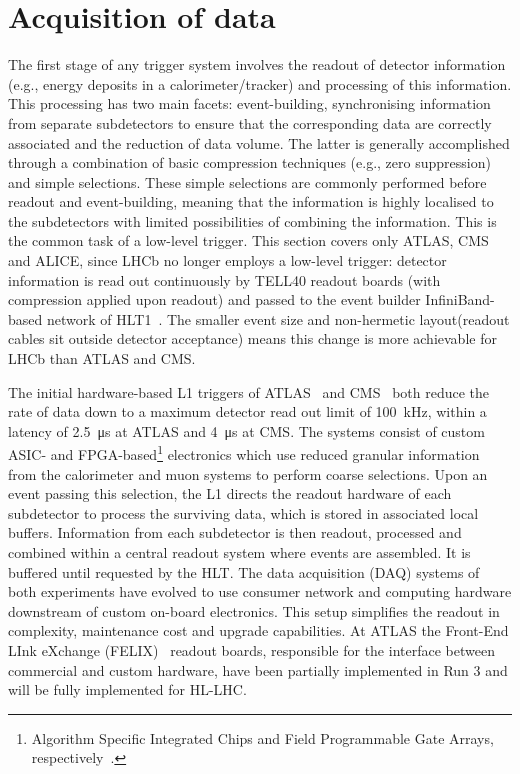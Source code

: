 \section{Acquisition of data}
The first stage of any trigger system involves the readout of detector information (e.g.,  energy deposits in a calorimeter/tracker) and processing of this information. This processing has two main facets: event-building, synchronising information from separate subdetectors to ensure that the corresponding data are correctly associated and the reduction of data volume. The latter is generally accomplished through a combination of basic compression techniques (e.g., zero suppression) and simple selections. These simple selections are commonly performed before readout and event-building, meaning that the information is highly localised to the subdetectors with limited possibilities of combining the information. This is the common task of a low-level trigger. This section covers only ATLAS, CMS and ALICE, since LHCb no longer employs a low-level trigger: detector information is read out continuously by TELL40 readout boards (with compression applied upon readout) and passed to the event builder InfiniBand-based network of HLT1~\cite{LHCb:2023hlw}. The smaller event size and non-hermetic layout(readout cables sit outside detector acceptance) means this change is more achievable for LHCb than ATLAS and CMS.


The initial hardware-based L1 triggers of ATLAS~\cite{ATLASRun3Detector} and CMS~\cite{cms2023development} both reduce the rate of data down to a maximum detector read out limit of \SI{100}{\kilo\hertz}, within a latency of \SI{2.5}{\micro\second} at ATLAS and \SI{4}{\micro\second} at CMS. The systems consist of custom ASIC- and FPGA-based\footnote{Algorithm Specific Integrated Chips and Field Programmable Gate Arrays, respectively~\cite{asics-fpgas}.} electronics which use reduced granular information from the calorimeter and muon systems to perform coarse selections. Upon an event passing this selection, the L1 directs the readout hardware of each subdetector to process the surviving data, which is stored in associated local buffers. Information from each subdetector is  then readout, processed and combined within a central readout system where events are assembled. It is buffered until requested by the HLT. The data acquisition (DAQ) systems of both experiments have evolved to use consumer network and computing hardware downstream of custom on-board electronics. This setup simplifies the readout in complexity, maintenance cost and upgrade capabilities. At ATLAS the Front-End LInk eXchange (FELIX)~\cite{ATLAS:FELIX} readout boards, responsible for the interface between commercial and custom hardware, have been partially implemented in Run 3 and will be fully implemented for HL-LHC.


